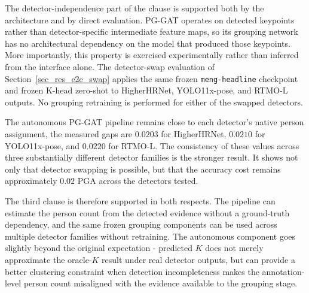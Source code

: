 The detector-independence part of the clause is supported both by the
architecture and by direct evaluation.
PG-GAT operates on detected keypoints rather than detector-specific
intermediate feature maps,
so its grouping network has no architectural dependency on the model
that produced those keypoints.
More importantly, this property is exercised experimentally rather than
inferred from the interface alone.
The detector-swap evaluation of Section~\ref{sec_res_e2e_swap} applies
the same frozen \texttt{meng-headline} checkpoint and frozen K-head
zero-shot to HigherHRNet,
YOLO11x-pose,
and RTMO-L outputs.
No grouping retraining is performed for either of the swapped detectors.

The autonomous PG-GAT pipeline remains close to each detector's native
person assignment,
the measured gaps are $0.0203$ for HigherHRNet,
$0.0210$ for YOLO11x-pose,
and $0.0220$ for RTMO-L.
The consistency of these values across three substantially different
detector families is the stronger result.
It shows not only that detector swapping is possible,
but that the accuracy cost remains approximately $0.02$ PGA across the
detectors tested.

The third clause is therefore supported in both respects.
The pipeline can estimate the person count from the detected evidence
without a ground-truth dependency,
and the same frozen grouping components can be used across multiple
detector families without retraining.
The autonomous component goes slightly beyond the original expectation -
predicted $K$ does not merely approximate the oracle-$K$ result under
real detector outputs,
but can provide a better clustering constraint when detection
incompleteness makes the annotation-level person count misaligned with
the evidence available to the grouping stage.